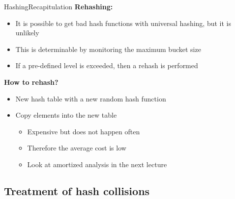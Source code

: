 \begin{frame}{Hashing}{Recapitulation}
  \textbf{Rehashing:}
  \begin{itemize}
    \item<2->
      It is possible to get bad hash functions with universal hashing, but it
      is unlikely
    \item<3->
      This is determinable by monitoring the maximum bucket size

    \item<4-> If a pre-defined level is exceeded, then a {\color{MainA}rehash} is performed
  \end{itemize}
  \textbf{How to rehash?}
  \begin{itemize}
    \item<5->
      New hash table with a new random hash function
    \item<6->
      Copy elements into the new table
      \begin{itemize}
        \item<7->
          Expensive but does not happen often
        \item<8->
          Therefore the average cost is low
        \item<9->
          Look at {\color{MainA}amortized analysis} in the next lecture
      \end{itemize}
  \end{itemize}
\end{frame}


\subsection{Treatment of hash collisions}

